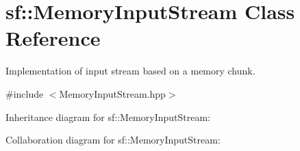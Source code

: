 \hypertarget{classsf_1_1_memory_input_stream}{}\section{sf\+:\+:Memory\+Input\+Stream Class Reference}
\label{classsf_1_1_memory_input_stream}


Implementation of input stream based on a memory chunk.  




{\ttfamily \#include $<$Memory\+Input\+Stream.\+hpp$>$}



Inheritance diagram for sf\+:\+:Memory\+Input\+Stream\+:


Collaboration diagram for sf\+:\+:Memory\+Input\+Stream\+:
